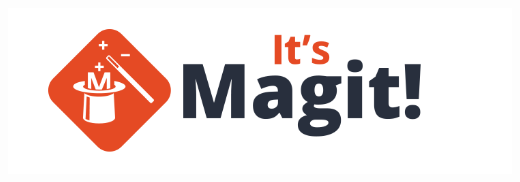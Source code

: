 \documentclass[9pt]{extarticle}
\begin{document}
\begin{multicols}{3}

  \begin{center}
    \includegraphics[scale=0.35]{magit.png}
  \end{center}

  \vspace{3ex}


\end{multicols}
\end{document}
